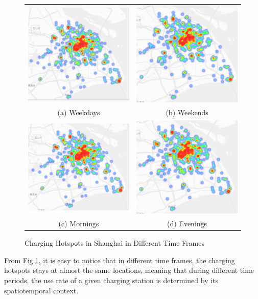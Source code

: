 \begin{figure}[!htbp]
	\begin{tabular}{cc}
		\includegraphics[width=0.45\columnwidth]{./figures/weekday.pdf} &  \includegraphics[width=0.45\columnwidth]{./figures/weekend.pdf} \\
		(a) Weekdays & (b) Weekends \\[6pt] 
		\includegraphics[width=0.45\columnwidth]{./figures/morning.pdf} &
		\includegraphics[width=0.45\columnwidth]{./figures/evening.pdf} \\
		(c) Mornings & (d) Evenings
	\end{tabular}
	\centering
	\caption{Charging Hotspots in Shanghai in Different Time Frames}
	\label{fig3}
\end{figure}
From Fig.\ref{fig3}, it is easy to notice that in different time frames, the charging hotspots stays at almost the same locations, meaning that during different time periods, the use rate of a given charging station is determined by its spatiotemporal context.


